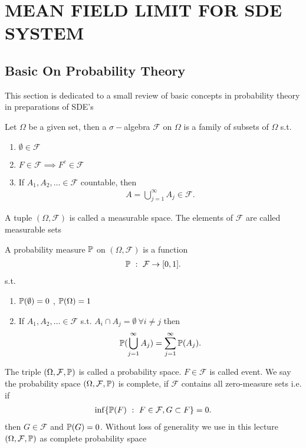 \chapter{MEAN FIELD LIMIT FOR SDE SYSTEM}
\section{Basic On Probability Theory}
This section is dedicated to a small review of basic concepts 
in probability theory in preparations of SDE's
\begin{definition}
 Let $\Omega $  be a given set, then a $\sigma-$algebra $\mathcal{F}$ on $\Omega $ is a
 family of subsets of $\Omega $ s.t.
 \begin{enumerate}
   \item $\emptyset \in  \mathcal{F}$
   \item $F \in  \mathcal{F} \implies F^{c} \in  \mathcal{F} $
   \item If $A_{1},A_{2},\ldots \in \mathcal{F}$ countable, then 
     \begin{align*}
       A = \bigcup_{j=1}^{\infty} A_j \in \mathcal{F}
     .\end{align*}
 \end{enumerate}
\end{definition}
\begin{definition}
 A tuple $(\Omega ,\mathcal{F})$  is called a measurable space. The elements of $\mathcal{F}$ are 
 called measurable sets 
\end{definition}
\begin{definition}
 A probability measure $\P$ on $(\Omega ,\mathcal{F})$  is a function 
 \begin{align*}
   \P \ : \ \mathcal{F} \to [0,1]
 .\end{align*}
 s.t.
 \begin{enumerate}
   \item $\P(\emptyset) = 0$ , $\P(\Omega ) = 1$
   \item If $A_{1},A_{2},\ldots \in \mathcal{F}$ s.t. $A_i \cap A_j = \emptyset \ \forall  i \neq j$  then
     \begin{align*}
       \P(\bigcup_{j=1}^{\infty} A_j ) = \sum_{j=1}^{\infty} \P(A_j) 
     .\end{align*}
 \end{enumerate}
\end{definition}
\begin{definition}
 The triple $(\Omega ,\mathcal{F},\P)$  is called a probability space. $F \in  \mathcal{F}$ is called
 event. We say the probability space $(\Omega ,\mathcal{F},\P)$ is complete, if $\mathcal{F}$ contains all zero-measure sets i.e.
 if 
 \begin{align*}
  \inf \{\P(F) \ : \ F \in  \mathcal{F},G \subset  F\}  = 0
 .\end{align*}
 then $G \in  \mathcal{F}$ and $\P(G) = 0$. Without loss of generality we use in this lecture $(\Omega ,\mathcal{F},\P)$
 as complete probability space
\end{definition}
